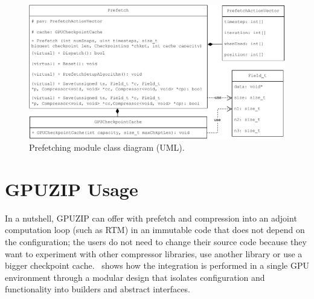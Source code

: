 \documentclass[Ingles,Final]{ic-tese-v3}
\begin{document}
\begin{figure}
  \centering
  \includegraphics[width=1\linewidth,trim={0 0 0 0},clip]{figures/oss/prefetch_uml.pdf}
  \caption[Prefetching module class diagram]{Prefetching module class diagram (UML).}
  \label{fig:prefetchuml}
\end{figure}


\section{GPUZIP Usage}
\label{sec:ossexample}
In a nutshell, GPUZIP can offer \checkpointing with prefetch and compression into an adjoint computation loop (such as RTM) in an immutable code that does not depend on the configuration; the users do not need to change their source code because they want to experiment with other compressor libraries, use another \checkpointing library or use a bigger checkpoint cache.~ shows how the integration is performed in a single GPU environment through a modular design that isolates configuration and functionality into builders and abstract interfaces.
\end{document}
